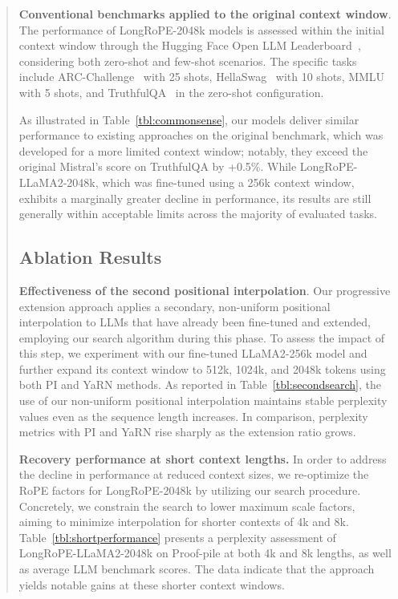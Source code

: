 \begin{abstract}
\textbf{Conventional benchmarks applied to the original context window}. The performance of LongRoPE-2048k models is assessed within the initial context window through the Hugging Face Open LLM Leaderboard~\cite{huggingfaceboard}, considering both zero-shot and few-shot scenarios. The specific tasks include ARC-Challenge~\cite{allenai:arc} with 25 shots, HellaSwag~\cite{zellers2019hellaswag} with 10 shots, MMLU~\cite{mmlu} with 5 shots, and TruthfulQA~\cite{lin2021truthfulqa} in the zero-shot configuration.

As illustrated in Table~\ref{tbl:commonsense}, our models deliver similar performance to existing approaches on the original benchmark, which was developed for a more limited context window; notably, they exceed the original Mistral’s score on TruthfulQA by +0.5\%. While LongRoPE-LLaMA2-2048k, which was fine-tuned using a 256k context window, exhibits a marginally greater decline in performance, its results are still generally within acceptable limits across the majority of evaluated tasks.

\subsection{Ablation Results}

\textbf{Effectiveness of the second positional interpolation}. Our progressive extension approach applies a secondary, non-uniform positional interpolation to LLMs that have already been fine-tuned and extended, employing our search algorithm during this phase. To assess the impact of this step, we experiment with our fine-tuned LLaMA2-256k model and further expand its context window to 512k, 1024k, and 2048k tokens using both PI and YaRN methods. As reported in Table~\ref{tbl:secondsearch}, the use of our non-uniform positional interpolation maintains stable perplexity values even as the sequence length increases. In comparison, perplexity metrics with PI and YaRN rise sharply as the extension ratio grows.

\textbf{Recovery performance at short context lengths.} In order to address the decline in performance at reduced context sizes, we re-optimize the RoPE factors for LongRoPE-2048k by utilizing our search procedure. Concretely, we constrain the search to lower maximum scale factors, aiming to minimize interpolation for shorter contexts of 4k and 8k. 
Table~\ref{tbl:shortperformance} presents a perplexity assessment of LongRoPE-LLaMA2-2048k on Proof-pile at both 4k and 8k lengths, as well as average LLM benchmark scores. The data indicate that the approach yields notable gains at these shorter context windows.


\end{abstract}
